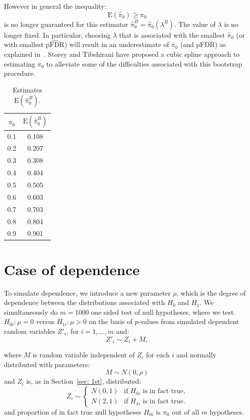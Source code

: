 \documentclass[10pt]{article}
\begin{document}
However in general the inequality:
\begin{equation}
	\text{E}(\widehat{\pi}_{0}) \geq \pi_{0}
\end{equation}
is no longer guaranteed for this estimator $\widehat{\pi}^{B}_{0} = \widehat{\pi}_{0}(\lambda^{B})$. The value of $\lambda$ is no longer fixed. In particular, choosing $\lambda$ that is associated with the smallest $\widehat{\pi}_{0}$ (or with smallest $\widehat{\text{pFDR}}$) will result in an underestimate of $\pi_{0}$ (and pFDR) as explained in~\cite{Black}. Storey and Tibshirani have proposed a cubic spline approach to estimating $\pi_{0}$ to alleviate some of the difficulties associated with this bootstrap procedure.

\begin{table}[H]
	\centering	
	\begin{tabular}{cc}
		$\pi_{0}$ &  $\text{E}(\widehat{\pi}^{B}_{0})$ \\ 
		\hline
		0.1 & 0.108 \\ 
		0.2 & 0.207 \\ 
		0.3 & 0.308 \\ 
		0.4 & 0.404 \\ 
		0.5 & 0.505 \\ 
		0.6 & 0.603 \\ 
		0.7 & 0.703 \\ 
		0.8 & 0.804 \\ 
		0.9 & 0.901 \\ 		
		\hline
	\end{tabular}
	\caption{Estimates $\text{E}(\widehat{\pi}^{B}_{0})$.}
	\label{tab: bootstrap}	
\end{table}


\section{Case of dependence} \label{sec: dependence}

To simulate dependence, we introduce a new parameter $\rho$, which is the degree of dependence between the distributions associated with $H_{0}$ and $H_{1}$. We simultaneously do $m = 1000$ one sided test of null hypotheses, where we test $H_{0i}: \mu = 0$ versus $H_{1i}: \mu > 0$ on the basis of $p$-values from simulated dependent random variables $Z'_{i}$, for $i = 1,...,m$ and:
\begin{equation}
Z'_{i} \sim Z_{i} + M,
\end{equation} 

where $M$ is random variable independent of $Z_{i}$ for each $i$ and normally distributed with parameters:
\begin{equation}
M \sim N(0, \rho) 
\end{equation} 
and $Z_{i}$ is, as in Section~\ref{sec: 1st}, distributed:
\[
Z_{i} \sim \begin{cases}
	N(0, 1) & \text{if $H_{0i}$ is in fact true,}\\
	N(2, 1) & \text{if $H_{1i}$ is in fact true.}
\end{cases}
\]
and proportion of in fact true null hypotheses $H_{0i}$ is $\pi_{0}$ out of all $m$ hypotheses.
\end{document}
